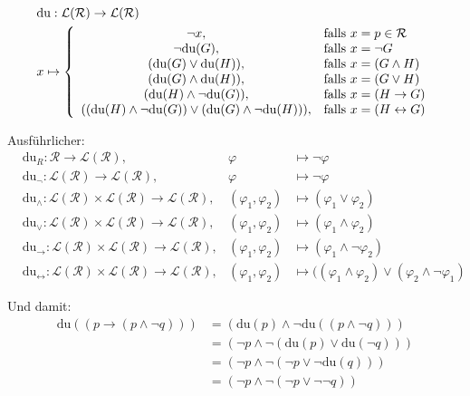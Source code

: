 \begin{lösung}
	\begin{align*}
		&\text{du}:\mathcal{L}(\mathcal{R})\to\mathcal{L}(\mathcal{R})\\
		&x\mapsto \left\lbrace\begin{array}{cl}
			\neg x, & \text{falls } x=p\in\mathcal{R}\\
			\neg\text{du}(G), & \text{falls } x=\neg G\\
			(\text{du}(G)\vee\text{du}(H)), & \text{falls } x=(G\wedge H)\\
			(\text{du}(G)\wedge\text{du}(H)), & \text{falls } x=(G\vee H)\\
			(\text{du}(H)\wedge\neg\text{du}(G)), & \text{falls } x=(H\to G)\\
			((\text{du}(H)\wedge\neg \text{du}(G))\vee(\text{du}(G)\wedge\neg\text{du}(H))), & \text{falls } x=(H\leftrightarrow G)\\
		\end{array}\right.
	\end{align*}

	Ausführlicher:
	\begin{align*}
		&\text{du}_R:\mathcal{R}\to\mathcal{L}(\mathcal{R}), 
			&\varphi&\mapsto\neg \varphi\\
		&\text{du}_{\neg}:\mathcal{L}(\mathcal{R})\to\mathcal{L}(\mathcal{R}),
			&\varphi&\mapsto\neg\varphi\\
		&\text{du}_{\wedge}:\mathcal{L}(\mathcal{R})\times\mathcal{L}(\mathcal{R})\to\mathcal{L}(\mathcal{R}),
			&(\varphi_1,\varphi_2)&\mapsto(\varphi_1\vee\varphi_2)\\
		&\text{du}_{\vee}:\mathcal{L}(\mathcal{R})\times\mathcal{L}(\mathcal{R})\to\mathcal{L}(\mathcal{R}),
			&(\varphi_1,\varphi_2)&\mapsto(\varphi_1\wedge\varphi_2)\\
		&\text{du}_{\to}:\mathcal{L}(\mathcal{R})\times\mathcal{L}(\mathcal{R})\to\mathcal{L}(\mathcal{R}),
			&(\varphi_1,\varphi_2)&\mapsto(\varphi_1\wedge\neg\varphi_2)\\
		&\text{du}_{\leftrightarrow}:\mathcal{L}(\mathcal{R})\times\mathcal{L}(\mathcal{R})\to\mathcal{L}(\mathcal{R}),
			&(\varphi_1,\varphi_2)&\mapsto((\varphi_1\wedge\varphi_2)\vee(\varphi_2\wedge\neg\varphi_1)
	\end{align*}

	Und damit:
	\begin{align*}
		\text{du}((p\to(p\wedge\neg q)))
		&=(\text{du}(p)\wedge\neg\text{du}((p\wedge\neg q)))\\
		&=(\neg p\wedge\neg(\text{du}(p)\vee\text{du}(\neg q)))\\
		&=(\neg p\wedge\neg(\neg p\vee\neg\text{du}(q)))\\
		&=(\neg p\wedge\neg(\neg p\vee\neg\neg q))\\
	\end{align*}
\end{lösung}
